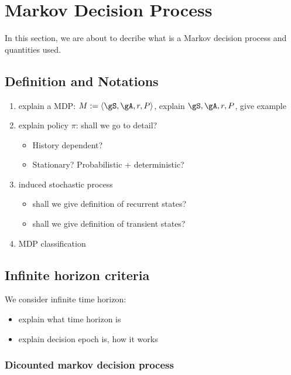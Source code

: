 \chapter{Markov Decision Process}
\label{ch:mdp}

In this section, we are about to decribe what is a Markov decision process and quantities used.

\section{Definition and Notations}

\begin{enumerate}
    \item explain a MDP: $M:=\langle\gS, \gA, r, P\rangle$, explain $\gS, \gA, r, P$, give example
    \item explain policy $\pi$: shall we go to detail?
        \begin{itemize}
            \item History dependent?
            \item Stationary? Probabilistic + deterministic?
        \end{itemize}
    \item induced stochastic process
        \begin{itemize}
            \item shall we give definition of recurrent states?
            \item shall we give definition of transient states?
        \end{itemize}
    \item MDP classification
\end{enumerate}

\section{Infinite horizon criteria}

We consider infinite time horizon:
\begin{itemize}
    \item explain what time horizon is
    \item explain decision epoch is, how it works
\end{itemize}

\subsection{Dicounted markov decision process}

